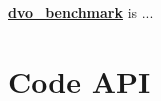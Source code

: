 

{\bfseries \mbox{\hyperlink{namespacedvo__benchmark}{dvo\+\_\+benchmark}}} is ...\hypertarget{index_codeapi}{}\section{Code A\+PI}\label{index_codeapi}
